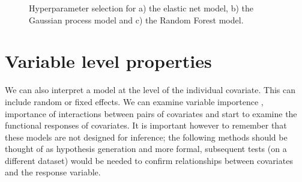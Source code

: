 \documentclass[10pt,]{article}
\begin{document}
\begin{figure}[t!]
  \centering

  \label{fig:hyp}
  \caption{
    Hyperparameter selection for a) the elastic net model, b) the Gaussian process model and c) the Random Forest model.
  }
\end{figure}




\section{Variable level properties}\label{variable-level-properties}

We can also interpret a model at the level of the individual covariate.
This can include random or fixed effects.
We can examine variable importence \citep{oppel2009alternative}, importance of interactions between pairs of covariates and start to examine the functional responses of covariates.
It is important however to remember that these models are not designed for inference; the following methods should be thought of as hypothesis generation and more formal, subsequent tests (on a different dataset) would be needed to confirm relationships between covariates and the response variable.
\end{document}
